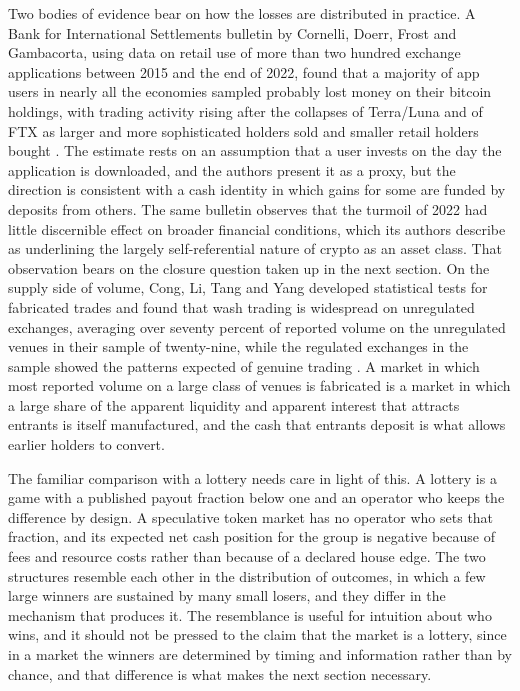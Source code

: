 \documentclass[11pt]{article}
\theoremstyle{remark}
\begin{document}
Two bodies of evidence bear on how the losses are distributed in practice. A Bank for International Settlements bulletin by Cornelli, Doerr, Frost and Gambacorta, using data on retail use of more than two hundred exchange applications between 2015 and the end of 2022, found that a majority of app users in nearly all the economies sampled probably lost money on their bitcoin holdings, with trading activity rising after the collapses of Terra/Luna and of FTX as larger and more sophisticated holders sold and smaller retail holders bought \cite{bis2023}. The estimate rests on an assumption that a user invests on the day the application is downloaded, and the authors present it as a proxy, but the direction is consistent with a cash identity in which gains for some are funded by deposits from others. The same bulletin observes that the turmoil of 2022 had little discernible effect on broader financial conditions, which its authors describe as underlining the largely self-referential nature of crypto as an asset class. That observation bears on the closure question taken up in the next section. On the supply side of volume, Cong, Li, Tang and Yang developed statistical tests for fabricated trades and found that wash trading is widespread on unregulated exchanges, averaging over seventy percent of reported volume on the unregulated venues in their sample of twenty-nine, while the regulated exchanges in the sample showed the patterns expected of genuine trading \cite{cong2022}. A market in which most reported volume on a large class of venues is fabricated is a market in which a large share of the apparent liquidity and apparent interest that attracts entrants is itself manufactured, and the cash that entrants deposit is what allows earlier holders to convert.

The familiar comparison with a lottery needs care in light of this. A lottery is a game with a published payout fraction below one and an operator who keeps the difference by design. A speculative token market has no operator who sets that fraction, and its expected net cash position for the group is negative because of fees and resource costs rather than because of a declared house edge. The two structures resemble each other in the distribution of outcomes, in which a few large winners are sustained by many small losers, and they differ in the mechanism that produces it. The resemblance is useful for intuition about who wins, and it should not be pressed to the claim that the market is a lottery, since in a market the winners are determined by timing and information rather than by chance, and that difference is what makes the next section necessary.
\end{document}
